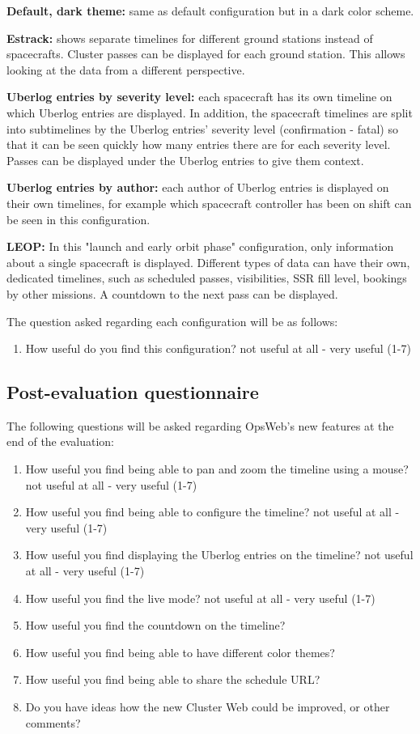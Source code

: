 \textbf{Default, dark theme:} same as default configuration but in a dark color scheme.

\textbf{Estrack:} shows separate timelines for different ground stations instead of spacecrafts. Cluster passes can be displayed for each ground station. This allows looking at the data from a different perspective.

\textbf{Uberlog entries by severity level:} each spacecraft has its own timeline on which Uberlog entries are displayed. In addition, the spacecraft timelines are split into subtimelines by the Uberlog entries' severity level (confirmation - fatal) so that it can be seen quickly how many entries there are for each severity level. Passes can be displayed under the Uberlog entries to give them context.

\textbf{Uberlog entries by author:} each author of Uberlog entries is displayed on their own timelines, for example which spacecraft controller has been on shift can be seen in this configuration.

\textbf{LEOP:} In this "launch and early orbit phase" configuration, only information about a single spacecraft is displayed. Different types of data can have their own, dedicated timelines, such as scheduled passes, visibilities, SSR fill level, bookings by other missions. A countdown to the next pass can be displayed.

The question asked regarding each configuration will be as follows:
\begin{enumerate}
\item How useful do you find this configuration? not useful at all - very useful (1-7)
\end{enumerate}

\subsection{Post-evaluation questionnaire} \label{post-evaluation}
The following questions will be asked regarding OpsWeb's new features at the end of the evaluation:
\begin{enumerate}
\item How useful you find being able to pan and zoom the timeline using a mouse? not useful at all - very useful (1-7)
\item How useful you find being able to configure the timeline? not useful at all - very useful (1-7)
\item How useful you find displaying the Uberlog entries on the timeline? not useful at all - very useful (1-7)
\item How useful you find the live mode? not useful at all - very useful (1-7)
\item How useful you find the countdown on the timeline?
\item How useful you find being able to have different color themes?
\item How useful you find being able to share the schedule URL?
\item Do you have ideas how the new Cluster Web could be improved, or other comments?
\end{enumerate}


